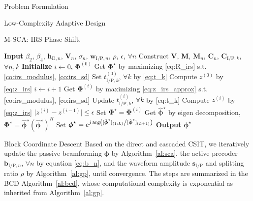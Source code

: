 \documentclass[journal]{IEEEtran}
\begin{document}
\begin{section}{Problem Formulation}
\begin{subsection}{Low-Complexity Adaptive Design}
			\begin{algorithm}[!t]
				\caption{M-SCA: IRS Phase Shift.}
				\label{al:m_sca}
				\begin{algorithmic}[1]
					\State \textbf{Input} $\beta_2$, $\beta_4$, $\boldsymbol{h}_{\mathrm{D},n}$, $\boldsymbol{V}_{n}$, $\sigma_n$, $\boldsymbol{w}_{\mathrm{I/P},n}$, $\rho$, $\epsilon$, $\forall n$
					\State Construct $\boldsymbol{V}$, $\boldsymbol{M}$, $\boldsymbol{M}_n$, $\boldsymbol{C}_{n}$, $\boldsymbol{C}_{\mathrm{I/P},k}$, $\forall n,k$
					\State \textbf{Initialize} $i \gets 0$, $\boldsymbol{\Phi}^{(0)}$
						\State Get $\boldsymbol{\Phi}^{\star}$ by maximizing \eqref{eq:R_irs} s.t. \eqref{co:irs_modulus}, \eqref{co:irs_sd}
					\Else
						\State Set $t_{\mathrm{I/P},k}^{(0)}$, $\forall k$ by \eqref{eq:t_k}
						\State Compute $z^{(0)}$ by \eqref{eq:z_irs}
						\Repeat
							\State $i \gets i + 1$
								\State Get $\boldsymbol{\Phi}^{(i)}$ by maximizing \eqref{eq:z_irs_approx} s.t. \eqref{co:irs_modulus}, \eqref{co:irs_sd}
								\State Update $t_{\mathrm{I/P},k}^{(i)}$, $\forall k$ by \eqref{eq:t_k}
								\State Compute $z^{(i)}$ by \eqref{eq:z_irs}
						\Until $\lvert z^{(i)}-z^{(i-1)} \rvert \le \epsilon$
						\State Set $\boldsymbol{\Phi}^{\star}=\boldsymbol{\Phi}^{(i)}$
					\EndIf
					\State Get $\hat{\boldsymbol{\phi}}^\star$ by eigen decomposition, $\boldsymbol{\Phi}^{\star}=\hat{\boldsymbol{\phi}}^\star(\hat{\boldsymbol{\phi}}^\star)^H$
					\State Set $\boldsymbol{\phi}^{\star}=e^{j \arg\left([\hat{\boldsymbol{\phi}}^\star]_{(1:L)} \middle/ [\hat{\boldsymbol{\phi}}^\star]_{(L+1)}\right)}$
					\State \textbf{Output} $\boldsymbol{\phi}^{\star}$
				\end{algorithmic}
			\end{algorithm}
		\end{subsection}


		\begin{subsection}{Block Coordinate Descent}
			Based on the direct and cascaded CSIT, we iteratively update the passive beamforming $\boldsymbol{\phi}$ by Algorithm~\ref{al:sca}, the active precoder $\boldsymbol{b}_{\mathrm{I/P},n}$, $\forall n$ by equation \eqref{eq:b_n}, and the waveform amplitude $\boldsymbol{s}_{\mathrm{I/P}}$ and splitting ratio $\rho$ by Algorithm~\ref{al:gp}, until convergence. The steps are summarized in the BCD Algorithm~\ref{al:bcd}, whose computational complexity is exponential as inherited from Algorithm~\ref{al:gp}.


\end{subsection}
\end{section}
\end{document}
